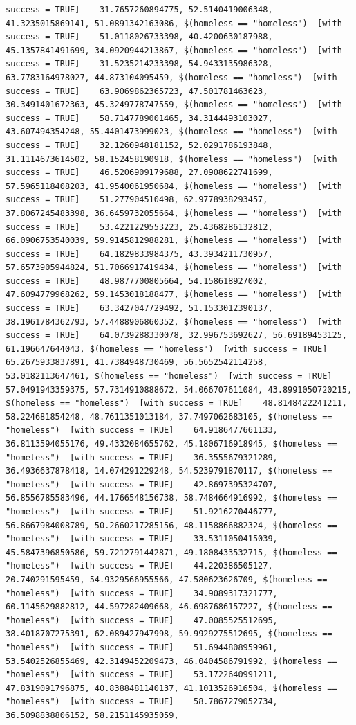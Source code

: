 \documentclass{tufte-book}\usepackage[]{graphicx}\usepackage[]{xcolor}
\makeatletter
\newenvironment{kframe}{%
 \def\at@end@of@kframe{}%
 \ifinner\ifhmode%
  \def\at@end@of@kframe{\end{minipage}}%
  \begin{minipage}{\columnwidth}%
 \fi\fi%
 \def\FrameCommand##1{\hskip\@totalleftmargin \hskip-\fboxsep
 \colorbox{shadecolor}{##1}\hskip-\fboxsep
     \hskip-\linewidth \hskip-\@totalleftmargin \hskip\columnwidth}%
 \MakeFramed {\advance\hsize-\width
   \@totalleftmargin\z@ \linewidth\hsize
   \@setminipage}}%
 {\par\unskip\endMakeFramed%
 \at@end@of@kframe}
\newenvironment{knitrout}{}{} %
\makeatother
\begin{document}
\begin{knitrout}
\begin{kframe}
\begin{verbatim}
success = TRUE]    31.7657260894775, 52.5140419006348, 41.3235015869141, 51.0891342163086, $(homeless == "homeless")  [with success = TRUE]    51.0118026733398, 40.4200630187988, 45.1357841491699, 34.0920944213867, $(homeless == "homeless")  [with success = TRUE]    31.5235214233398, 54.9433135986328, 63.7783164978027, 44.873104095459, $(homeless == "homeless")  [with success = TRUE]    63.9069862365723, 47.501781463623, 30.3491401672363, 45.3249778747559, $(homeless == "homeless")  [with success = TRUE]    58.7147789001465, 34.3144493103027, 43.607494354248, 55.4401473999023, $(homeless == "homeless")  [with success = TRUE]    32.1260948181152, 52.0291786193848, 31.1114673614502, 58.152458190918, $(homeless == "homeless")  [with success = TRUE]    46.5206909179688, 27.0908622741699, 57.5965118408203, 41.9540061950684, $(homeless == "homeless")  [with success = TRUE]    51.277904510498, 62.9778938293457, 37.8067245483398, 36.6459732055664, $(homeless == "homeless")  [with success = TRUE]    53.4221229553223, 25.4368286132812, 66.0906753540039, 59.9145812988281, $(homeless == "homeless")  [with success = TRUE]    64.1829833984375, 43.3934211730957, 57.6573905944824, 51.7066917419434, $(homeless == "homeless")  [with success = TRUE]    48.9877700805664, 54.158618927002, 47.6094779968262, 59.1453018188477, $(homeless == "homeless")  [with success = TRUE]    63.3427047729492, 51.1533012390137, 38.1961784362793, 57.4488906860352, $(homeless == "homeless")  [with success = TRUE]    64.0739288330078, 32.996753692627, 56.69189453125, 61.196647644043, $(homeless == "homeless")  [with success = TRUE]    65.2675933837891, 41.7384948730469, 56.5652542114258, 53.0182113647461, $(homeless == "homeless")  [with success = TRUE]    57.0491943359375, 57.7314910888672, 54.066707611084, 43.8991050720215, $(homeless == "homeless")  [with success = TRUE]    48.8148422241211, 58.224681854248, 48.7611351013184, 37.7497062683105, $(homeless == "homeless")  [with success = TRUE]    64.9186477661133, 36.8113594055176, 49.4332084655762, 45.1806716918945, $(homeless == "homeless")  [with success = TRUE]    36.3555679321289, 36.4936637878418, 14.074291229248, 54.5239791870117, $(homeless == "homeless")  [with success = TRUE]    42.8697395324707, 56.8556785583496, 44.1766548156738, 58.7484664916992, $(homeless == "homeless")  [with success = TRUE]    51.9216270446777, 56.8667984008789, 50.2660217285156, 48.1158866882324, $(homeless == "homeless")  [with success = TRUE]    33.5311050415039, 45.5847396850586, 59.7212791442871, 49.1808433532715, $(homeless == "homeless")  [with success = TRUE]    44.220386505127, 20.740291595459, 54.9329566955566, 47.580623626709, $(homeless == "homeless")  [with success = TRUE]    34.9089317321777, 60.1145629882812, 44.597282409668, 46.6987686157227, $(homeless == "homeless")  [with success = TRUE]    47.0085525512695, 38.4018707275391, 62.089427947998, 59.9929275512695, $(homeless == "homeless")  [with success = TRUE]    51.6944808959961, 53.5402526855469, 42.3149452209473, 46.0404586791992, $(homeless == "homeless")  [with success = TRUE]    53.1722640991211, 47.8319091796875, 40.8388481140137, 41.1013526916504, $(homeless == "homeless")  [with success = TRUE]    58.7867279052734, 36.5098838806152, 58.2151145935059, 
\end{verbatim}
\end{kframe}
\end{knitrout}
\end{document}
